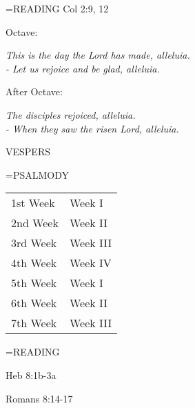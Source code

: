 \hangindent=\parindent \small{READING}    Col 2:9, 12 \textbf{   }

\begin{center}
\end{center}Octave:\begin{center}\textit{	This is the day the Lord has made, alleluia.\\
- Let us rejoice and be glad, alleluia.}
\end{center}After Octave:\begin{center}\textit{	The disciples rejoiced, alleluia.\\
- When they saw the risen Lord, alleluia.}
\end{center}

\begin{flushleft}\normalsize VESPERS\\\end{flushleft}

\hangindent=\parindent \small{PSALMODY}
\begin{center}
\begin{tabular}{ l l }
1st Week &  Week I\\
2nd Week &  Week II\\
3rd Week &  Week III\\
4th Week &  Week IV\\
5th Week &  Week I\\
6th Week &  Week II\\
7th Week &  Week III\\
\end{tabular}
\end{center}		

\hangindent=\parindent \small READING
\begin{description}[labelindent=\parindent, leftmargin=*]
\item [1st-6th Week:]     Heb 8:1b-3a \textbf{    }
\item [7th Week:]     Romans 8:14-17 \textbf{    }
\end{description}
